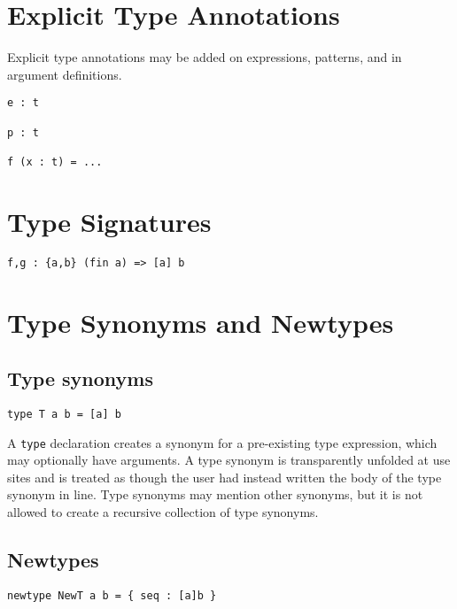 \section{Explicit Type Annotations}\label{explicit-type-annotations}

Explicit type annotations may be added on expressions, patterns, and in
argument definitions.

\begin{verbatim}
e : t

p : t

f (x : t) = ...
\end{verbatim}

\section{Type Signatures}\label{type-signatures}

\begin{verbatim}
f,g : {a,b} (fin a) => [a] b
\end{verbatim}

\section{Type Synonyms and Newtypes}\label{type-synonyms-and-newtypes}

\subsection{Type synonyms}\label{type-synonyms}

\begin{verbatim}
type T a b = [a] b
\end{verbatim}

A \texttt{type} declaration creates a synonym for a pre-existing type
expression, which may optionally have arguments. A type synonym is
transparently unfolded at use sites and is treated as though the user
had instead written the body of the type synonym in line. Type synonyms
may mention other synonyms, but it is not allowed to create a recursive
collection of type synonyms.

\subsection{Newtypes}\label{newtypes}

\begin{verbatim}
newtype NewT a b = { seq : [a]b }
\end{verbatim}

